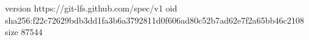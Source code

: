version https://git-lfs.github.com/spec/v1
oid sha256:f22c72629bdb3dd1fa3b6a3792811d0f606ad80c52b7ad62e7f2a65bb46c2108
size 87544
